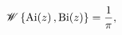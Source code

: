 \[\mathop{\mathscr{W}\/}\nolimits\left\{\mathop{\mathrm{Ai}\/}\nolimits\!\left(z%
\right),\mathop{\mathrm{Bi}\/}\nolimits\!\left(z\right)\right\}=\frac{1}{\pi},\]